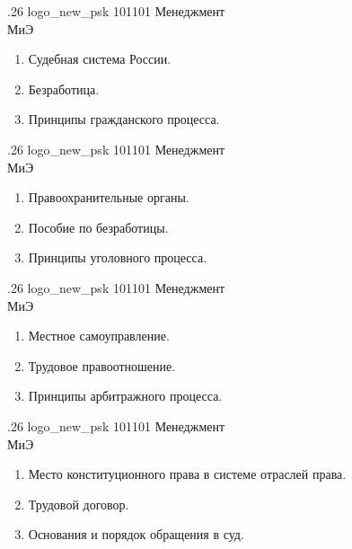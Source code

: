\documentclass[
	12pt,
	a4paper,
	]
	{article}
\newcommand{\shapkFull}{
	\shapk
		{.26}
		{logo_new_psk}
		{101101}
		{Менеджмент\\}
		{МиЭ}
		{}
}
\begin{document}
\newpage


\shapkFull
\setcounter{zad}{0}

\begin{enumerate}
	\item Судебная система России.

	\item Безработица.

	\item Принципы гражданского процесса.

\end{enumerate}

\newpage


\shapkFull
\setcounter{zad}{0}

\begin{enumerate}
	\item Правоохранительные органы.

	\item Пособие по безработицы.

	\item Принципы уголовного процесса.

\end{enumerate}

\newpage


\shapkFull
\setcounter{zad}{0}

\begin{enumerate}
	\item Местное самоуправление.

	\item Трудовое правоотношение.

	\item Принципы арбитражного процесса.

\end{enumerate}

\newpage


\shapkFull
\setcounter{zad}{0}

\begin{enumerate}
	\item Место конституционного права в системе отраслей права.

	\item Трудовой договор.

	\item Основания и порядок обращения в суд.

\end{enumerate}
\end{document}
